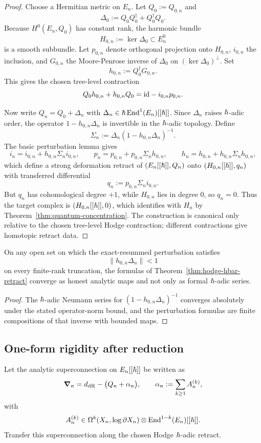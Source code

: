\begin{proof}
Choose a Hermitian metric on $E_n$. Let $Q_0:=Q_{0,n}$ and
\[
 \Delta_0 := Q_0Q_0^{\dagger}+Q_0^{\dagger}Q_0.
\]
Because $H^0(E_n,Q_0)$ has constant rank, the harmonic bundle
\[
 H_{0,n}:=\ker\Delta_0\subset E_n^0
\]
is a smooth subbundle. Let $p_{0,n}$ denote orthogonal projection onto $H_{0,n}$, $i_{0,n}$ the inclusion, and $G_{0,n}$ the Moore-Penrose inverse of $\Delta_0$ on $(\ker\Delta_0)^\perp$. Set
\[
 h_{0,n}:=Q_0^{\dagger}G_{0,n}.
\]
This gives the chosen tree-level contraction
\[
 Q_0h_{0,n}+h_{0,n}Q_0 = \mathrm{id} - i_{0,n}p_{0,n}.
\]

Now write $Q_n=Q_0+\Delta_n$ with $\Delta_n\in \hbar\,\mathrm{End}^1(E_n)[[\hbar]]$. Since $\Delta_n$ raises $\hbar$-adic order, the operator $1-h_{0,n}\Delta_n$ is invertible in the $\hbar$-adic topology. Define
\[
 \Sigma_n := \Delta_n(1-h_{0,n}\Delta_n)^{-1}.
\]
The basic perturbation lemma gives
\[
 i_n=i_{0,n}+h_{0,n}\Sigma_n i_{0,n},
 \qquad
 p_n=p_{0,n}+p_{0,n}\Sigma_n h_{0,n},
 \qquad
 h_n=h_{0,n}+h_{0,n}\Sigma_n h_{0,n},
\]
which define a strong deformation retract of $(E_n[[\hbar]],Q_n)$ onto $(H_{0,n}[[\hbar]],q_n)$ with transferred differential
\[
 q_n:=p_{0,n}\Sigma_n i_{0,n}.
\]
But $q_n$ has cohomological degree $+1$, while $H_{0,n}$ lies in degree $0$, so $q_n=0$. Thus the target complex is $(H_{0,n}[[\hbar]],0)$, which identifies with $H_n$ by Theorem~\ref{thm:quantum-concentration}. The construction is canonical only relative to the chosen tree-level Hodge contraction; different contractions give homotopic retract data.
\end{proof}

\begin{proposition}\label{prop:analytic-retract}
On any open set on which the exact-resummed perturbation satisfies
\[
 \|h_{0,n}\Delta_n\|<1
\]
on every finite-rank truncation, the formulas of Theorem~\ref{thm:hodge-hbar-retract} converge as honest analytic maps and not only as formal $\hbar$-adic series.
\end{proposition}

\begin{proof}
The $\hbar$-adic Neumann series for $(1-h_{0,n}\Delta_n)^{-1}$ converges absolutely under the stated operator-norm bound, and the perturbation formulas are finite compositions of that inverse with bounded maps.
\end{proof}

\subsection{One-form rigidity after reduction}
Let the analytic superconnection on $E_n[[\hbar]]$ be written as
\[
 \boldsymbol{\nabla}_n = d_{\mathrm{dR}}-\big(Q_n+\alpha_n\big),
 \qquad
 \alpha_n:=\sum_{k\ge 1}A_n^{(k)},
\]
with
\[
 A_n^{(k)}\in \Omega^k(X_n,\log\partial X_n)\otimes \mathrm{End}^{1-k}(E_n)[[\hbar]].
\]
Transfer this superconnection along the chosen Hodge $\hbar$-adic retract.

